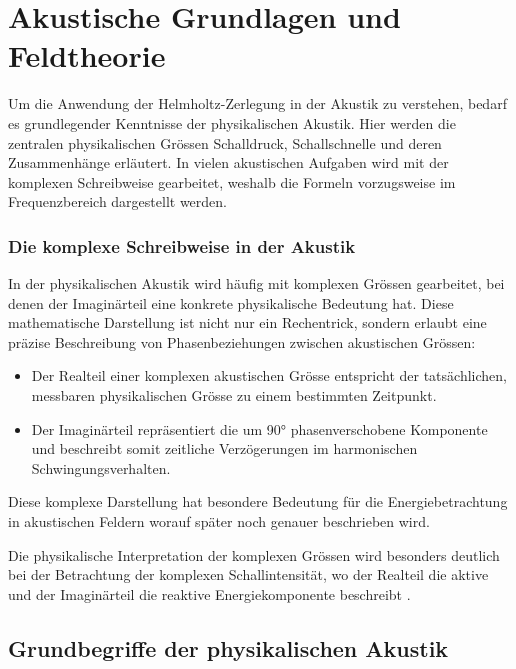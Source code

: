 %
%
%
%
\section{Akustische Grundlagen und Feldtheorie
\label{helmholtz:section:akustische_Grundlagen}}

Um die Anwendung der Helmholtz-Zerlegung in der Akustik zu verstehen, bedarf es grundlegender Kenntnisse der physikalischen Akustik.
Hier werden die zentralen physikalischen Grössen Schalldruck, Schallschnelle und deren Zusammenhänge erläutert.
In vielen akustischen Aufgaben wird mit der komplexen Schreibweise gearbeitet, weshalb die Formeln vorzugsweise im Frequenzbereich dargestellt werden.

\subsubsection{Die komplexe Schreibweise in der Akustik}

In der physikalischen Akustik wird häufig mit komplexen Grössen gearbeitet, bei denen der Imaginärteil eine konkrete physikalische Bedeutung hat. Diese mathematische Darstellung ist nicht nur ein Rechentrick, sondern erlaubt eine präzise Beschreibung von Phasenbeziehungen zwischen akustischen Grössen:

\begin{itemize}
\item Der Realteil einer komplexen akustischen Grösse entspricht der tatsächlichen, messbaren physikalischen Grösse zu einem bestimmten Zeitpunkt.

\item Der Imaginärteil repräsentiert die um 90° phasenverschobene Komponente und beschreibt somit zeitliche Verzögerungen im harmonischen Schwingungsverhalten.
\end{itemize}
Diese komplexe Darstellung hat besondere Bedeutung für die Energiebetrachtung in akustischen Feldern worauf später noch genauer beschrieben wird.

Die physikalische Interpretation der komplexen Grössen wird besonders deutlich bei der Betrachtung der komplexen Schallintensität, wo der Realteil die aktive und der Imaginärteil die reaktive Energiekomponente beschreibt \cite{helmholtz:paper}.



\subsection{Grundbegriffe der physikalischen Akustik
\label{helmholtz:subsection:Grundbegriffe_Akustik}}

